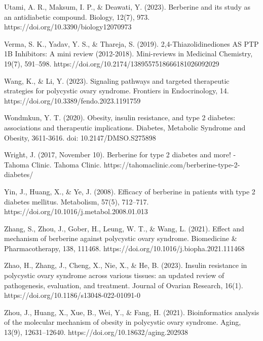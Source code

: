 Utami, A. R., Maksum, I. P., & Deawati, Y. (2023). Berberine and its study as an antidiabetic compound. Biology, 12(7), 973. https://doi.org/10.3390/biology12070973

Verma, S. K., Yadav, Y. S., & Thareja, S. (2019). 2,4-Thiazolidinediones AS PTP 1B Inhibitors: A mini review (2012-2018). Mini-reviews in Medicinal Chemistry, 19(7), 591–598. https://doi.org/10.2174/1389557518666181026092029

Wang, K., & Li, Y. (2023). Signaling pathways and targeted therapeutic strategies for polycystic ovary syndrome. Frontiers in Endocrinology, 14. https://doi.org/10.3389/fendo.2023.1191759

Wondmkun, Y. T. (2020). Obesity, insulin resistance, and type 2 diabetes: associations and therapeutic implications. Diabetes, Metabolic Syndrome and Obesity, 3611-3616. doi: 10.2147/DMSO.S275898

Wright, J. (2017, November 10). Berberine for type 2 diabetes and more! - Tahoma Clinic. Tahoma Clinic. https://tahomaclinic.com/berberine-type-2-diabetes/

Yin, J., Huang, X., & Ye, J. (2008). Efficacy of berberine in patients with type 2 diabetes mellitus. Metabolism, 57(5), 712–717. https://doi.org/10.1016/j.metabol.2008.01.013

Zhang, S., Zhou, J., Gober, H., Leung, W. T., & Wang, L. (2021). Effect and mechanism of berberine against polycystic ovary syndrome. Biomedicine & Pharmacotherapy, 138, 111468. https://doi.org/10.1016/j.biopha.2021.111468

Zhao, H., Zhang, J., Cheng, X., Nie, X., & He, B. (2023). Insulin resistance in polycystic ovary syndrome across various tissues: an updated review of pathogenesis, evaluation, and treatment. Journal of Ovarian Research, 16(1). https://doi.org/10.1186/s13048-022-01091-0

Zhou, J., Huang, X., Xue, B., Wei, Y., & Fang, H. (2021). Bioinformatics analysis of the molecular mechanism of obesity in polycystic ovary syndrome. Aging, 13(9), 12631–12640. https://doi.org/10.18632/aging.202938